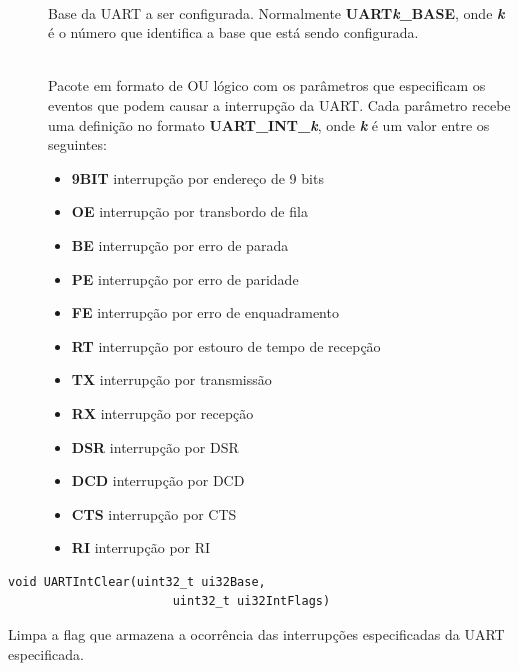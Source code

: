 \begin{description}
	\item []\hfill \\
	Base da UART a ser configurada. Normalmente \textbf{UART\emph{k}\_BASE}, onde \textbf{\emph{k}} é o número que identifica a base que está sendo configurada.
	
	\item []\hfill \\
	Pacote em formato de OU lógico com os parâmetros que especificam os eventos que podem causar a interrupção da UART. Cada parâmetro recebe uma definição no formato \textbf{UART\_INT\_\emph{k}}, onde \textbf{\emph{k}} é um valor entre os seguintes:
	\begin{itemize}
		\item \textbf{9BIT} interrupção por endereço de 9 bits
		\item \textbf{OE} interrupção por transbordo de fila
		\item \textbf{BE} interrupção por erro de parada
		\item \textbf{PE} interrupção por erro de paridade
		\item \textbf{FE} interrupção por erro de enquadramento
		\item \textbf{RT} interrupção por estouro de tempo de recepção
		\item \textbf{TX} interrupção por transmissão
		\item \textbf{RX} interrupção por recepção
		\item \textbf{DSR} interrupção por DSR
		\item \textbf{DCD} interrupção por DCD
		\item \textbf{CTS} interrupção por CTS
		\item \textbf{RI} interrupção por RI
	\end{itemize}
\end{description}

\begin{lstlisting}[style=funcao]
	void UARTIntClear(uint32_t ui32Base,
					   uint32_t ui32IntFlags)
\end{lstlisting}

Limpa a flag que armazena a ocorrência das interrupções especificadas da UART especificada.

